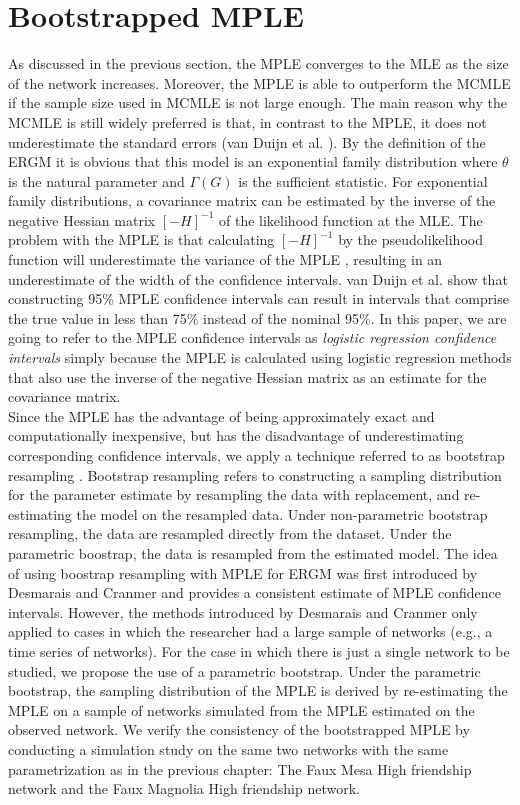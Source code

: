 \documentclass[10pt, conference, compsocconf]{IEEEtran}
\begin{document}
\section{Bootstrapped MPLE}
As discussed in the previous section, the MPLE converges to the MLE as the size of the network increases. Moreover, the MPLE is able to outperform the MCMLE if the sample size used in MCMLE is not large enough. The main reason why the MCMLE is still widely preferred is that, in contrast to the MPLE, it does not underestimate the standard errors (van Duijn et al. \cite{vanDuijnetal2009}). By the definition of the ERGM it is obvious that this model is an exponential family distribution where $\theta$ is the natural parameter and $\Gamma (G)$ is the sufficient statistic. For exponential family distributions, a covariance matrix can be estimated by the inverse of the negative Hessian matrix $[-H]^{-1}$ of the likelihood function at the MLE. The problem with the MPLE is that calculating $[-H]^{-1}$ by the pseudolikelihood function will underestimate the variance of the MPLE \cite{vanDuijnetal2009}, resulting in an underestimate of the width of the confidence intervals. van Duijn et al. show that constructing 95\% MPLE confidence intervals can result in intervals that comprise the true value in less than 75\% instead of the nominal 95\%. In this paper, we are going to refer to the MPLE confidence intervals as \textit{logistic regression confidence intervals} simply because the MPLE is calculated using logistic regression methods that also use the inverse of the negative Hessian matrix as an estimate for the covariance matrix. \\
\indent Since the MPLE has the advantage of being approximately exact and computationally inexpensive, but has the disadvantage of underestimating corresponding confidence intervals, we apply a technique referred to as bootstrap resampling \cite{efron1982jackknife}. Bootstrap resampling refers to constructing a sampling distribution for the parameter estimate by resampling the data with replacement, and re-estimating the model on the resampled data. Under non-parametric bootstrap resampling, the data are resampled directly from the dataset. Under the parametric boostrap, the data is resampled from the estimated model. The idea of using boostrap resampling with MPLE for ERGM was first introduced by Desmarais and Cranmer \cite{Desmarais.2012} and provides a consistent estimate of MPLE confidence intervals. However, the methods introduced by Desmarais and Cranmer \cite{Desmarais.2012} only applied to cases in which the researcher had a large sample of networks (e.g., a time series of networks). For the case in which there is just a single network to be studied, we propose the use of a parametric bootstrap. Under the parametric bootstrap, the sampling distribution of the MPLE is derived by re-estimating the MPLE on a sample of networks simulated from the MPLE estimated on the observed network. We verify the consistency of the bootstrapped MPLE by conducting a simulation study on the same two networks with the same parametrization as in the previous chapter: The Faux Mesa High friendship network and the Faux Magnolia High friendship network. \\
\end{document}
